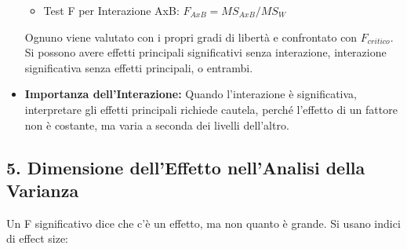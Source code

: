 \documentclass[12pt, a4paper]{article}
\newcommand{\Fscore}{F} %
\begin{document}
\begin{itemize}
\begin{itemize}
            \item Test F per Interazione AxB: $F_{AxB} = MS_{AxB} / MS_W$
        \end{itemize}
        Ognuno viene valutato con i propri gradi di libertà e confrontato con $\Fscore_{critico}$. Si possono avere effetti principali significativi senza interazione, interazione significativa senza effetti principali, o entrambi.
    \item \textbf{Importanza dell'Interazione:} Quando l'interazione è significativa, interpretare gli effetti principali richiede cautela, perché l'effetto di un fattore non è costante, ma varia a seconda dei livelli dell'altro.
\end{itemize}

\subsection*{5. Dimensione dell'Effetto nell'Analisi della Varianza}
Un F significativo dice che c'è un effetto, ma non quanto è grande. Si usano indici di effect size:
\end{document}
